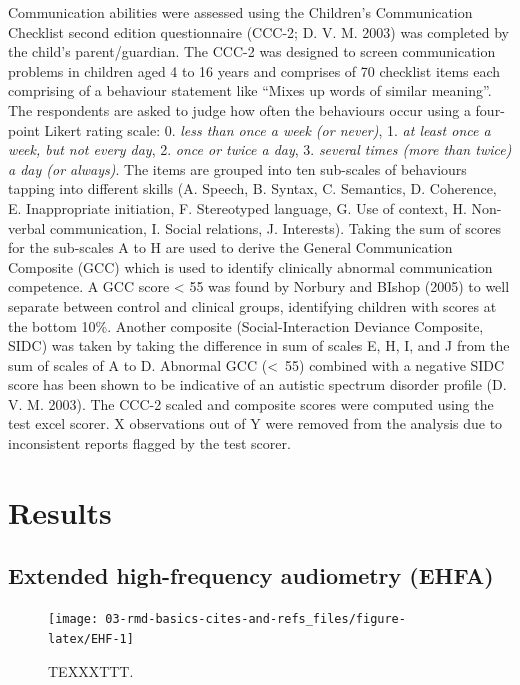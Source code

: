 \documentclass[a4paper,nobind]{templates/ociamthesis}
\begin{document}
Communication abilities were assessed using the Children's Communication Checklist second edition questionnaire (CCC-2; D. V. M. 2003) was completed by the child's parent/guardian. The CCC-2 was designed to screen communication problems in children aged 4 to 16 years and comprises of 70 checklist items each comprising of a behaviour statement like ``Mixes up words of similar meaning''. The respondents are asked to judge how often the behaviours occur using a four-point Likert rating scale: 0. \emph{less than once a week (or never)}, 1. \emph{at least once a week, but not every day}, 2. \emph{once or twice a day}, 3. \emph{several times (more than twice) a day (or always)}. The items are grouped into ten sub-scales of behaviours tapping into different skills (A. Speech, B. Syntax, C. Semantics, D. Coherence, E. Inappropriate initiation, F. Stereotyped language, G. Use of context, H. Non-verbal communication, I. Social relations, J. Interests). Taking the sum of scores for the sub-scales A to H are used to derive the General Communication Composite (GCC) which is used to identify clinically abnormal communication competence. A GCC score \textless{} 55 was found by Norbury and BIshop (2005) to well separate between control and clinical groups, identifying children with scores at the bottom 10\%. Another composite (Social-Interaction Deviance Composite, SIDC) was taken by taking the difference in sum of scales E, H, I, and J from the sum of scales of A to D. Abnormal GCC (\textless~55) combined with a negative SIDC score has been shown to be indicative of an autistic spectrum disorder profile (D. V. M. 2003). The CCC-2 scaled and composite scores were computed using the test excel scorer. X observations out of Y were removed from the analysis due to inconsistent reports flagged by the test scorer.

\hypertarget{results}{%
\section{Results}\label{results}}

\hypertarget{extended-high-frequency-audiometry-ehfa-1}{%
\subsection{Extended high-frequency audiometry (EHFA)}\label{extended-high-frequency-audiometry-ehfa-1}}

\begin{figure}

{\centering \texttt{[image: 03-rmd-basics-cites-and-refs\_files/figure-latex/EHF-1]} 

}

\caption{TEXXXTTT.}\label{fig:EHF}
\end{figure}
\end{document}
